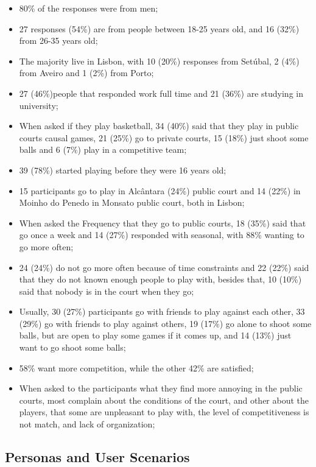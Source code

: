\begin{itemize}
	\item 80\% of the responses were from men;
	\item  27 responses (54\%)  are from people between 18-25 years old, and 16 (32\%) from 26-35 years old;
	\item The majority live in Lisbon, with 10 (20\%) responses from Setúbal, 2 (4\%) from Aveiro and 1 (2\%) from Porto;
	\item 27 (46\%)people that responded work full time and 21 (36\%) are studying in university;
	\item When asked if they play basketball, 34 (40\%) said that they play in public courts causal games, 21 (25\%) go to private courts, 15 (18\%) just shoot some balls and 6 (7\%) play in a competitive team;
	\item 39 (78\%) started playing before they were 16 years old;
	\item 15 participants go to play in Alcântara (24\%) public court and 14 (22\%) in Moinho do Penedo in Monsato public court, both in Lisbon;
	\item When asked the Frequency that they go to public courts, 18 (35\%) said that go once a week and 14 (27\%) responded with seasonal, with 88\% wanting to go more often;
	\item 24 (24\%) do not go more often because of time constraints and 22 (22\%) said that they do not known enough people to play with, besides that, 10 (10\%) said that nobody is in the court when they go;
	\item Usually, 30 (27\%) participants go with friends to play against each other, 33 (29\%) go with friends to play against others, 19 (17\%) go alone to shoot some balls, but are open to play some games if it comes up, and 14 (13\%) just want to go shoot some balls;
	\item 58\% want more competition, while the other 42\% are satisfied;
	\item When asked to the participants what they find more annoying in the public courts, most complain about the conditions of the court, and other about the players, that some are unpleasant to play with, the level of competitiveness is not match, and lack of organization;
\end{itemize}


\subsection{Personas and User Scenarios}
\label{sec:rp-personas}

